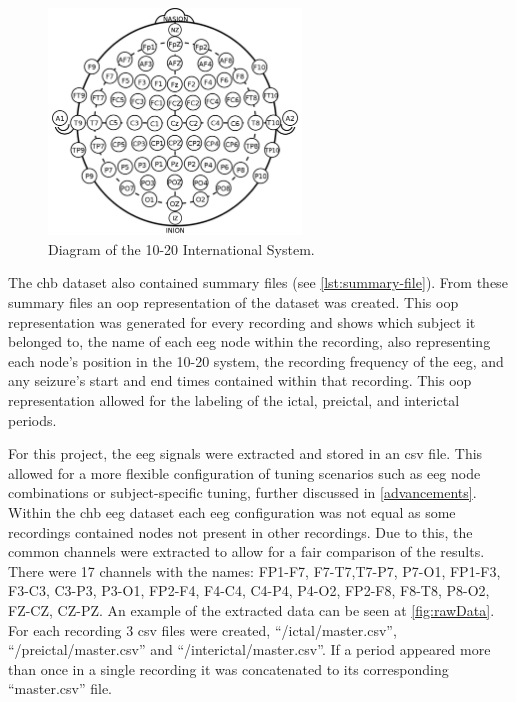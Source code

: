 \documentclass[12pt]{article}
\begin{document}
\begin{figure}[H]
\includegraphics[width=0.6\textwidth]{10-20}
\centering
\caption{Diagram of the 10-20 International System. \protect\cite{tomaton1242010}}
\label{fig:10-20}
\end{figure}


The \acrshort{chb} dataset also contained summary files (see \ref{lst:summary-file}). From these summary files an \acrfull{oop} representation of the dataset was created. This \acrshort{oop} representation was generated for every recording and shows which subject it belonged to, the name of each \acrshort{eeg} node within the recording, also representing each node's position in the 10-20 system, the recording frequency of the \acrshort{eeg}, and any seizure's start and end times contained within that recording. This \acrshort{oop} representation allowed for the labeling of the ictal, preictal, and interictal periods.

For this project, the \acrshort{eeg} signals were extracted and stored in an \acrshort{csv} file. This allowed for a more flexible configuration of tuning scenarios such as \acrshort{eeg} node combinations or subject-specific tuning, further discussed in \ref{advancements}. Within the \acrshort{chb} \acrshort{eeg} dataset each \acrshort{eeg} configuration was not equal as some recordings contained nodes not present in other recordings. Due to this, the common channels were extracted to allow for a fair comparison of the results. There were 17 channels with the names: FP1-F7, F7-T7,T7-P7, P7-O1, FP1-F3, F3-C3, C3-P3, P3-O1, FP2-F4, F4-C4, C4-P4, P4-O2, FP2-F8, F8-T8, P8-O2, FZ-CZ, CZ-PZ. An example of the extracted data can be seen at \ref{fig:rawData}. For each recording 3 \acrshort{csv} files were created, ``/ictal/master.csv'', ``/preictal/master.csv'' and ``/interictal/master.csv''. If a period appeared more than once in a single recording it was concatenated to its corresponding ``master.csv'' file.
\end{document}
